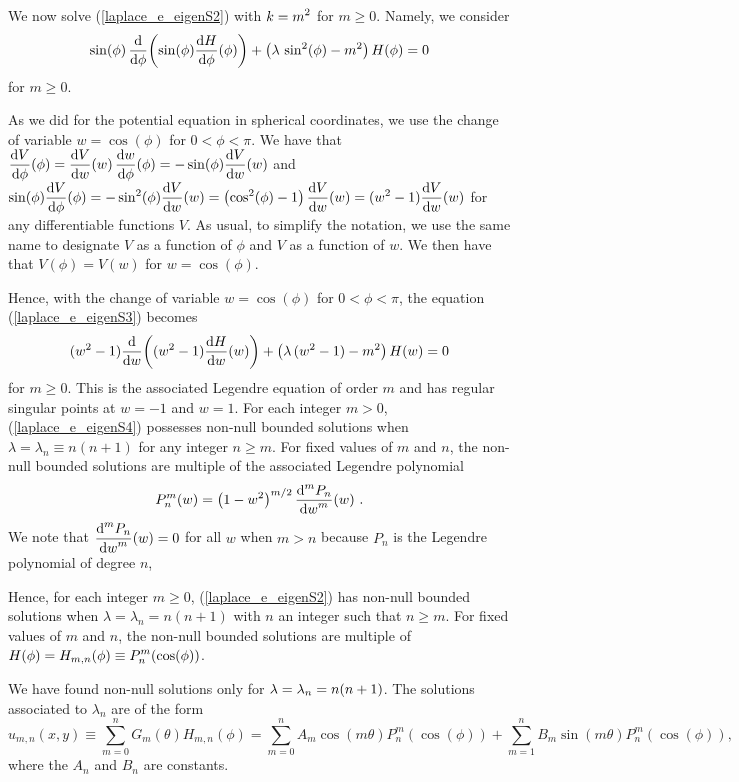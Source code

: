 We now solve (\ref{laplace_e_eigenS2}) with $\DS k=m^2$
for $m\geq 0$.  Namely, we consider
\begin{equation} \label{laplace_e_eigenS3}
\sin(\phi)\,\dfdx{\left(\sin(\phi)\dydx{H}{\phi}(\phi)\right)}{\phi}
+\left(\lambda\,\sin^2(\phi) - m^2\right)H(\phi) = 0
\end{equation}
for $m\geq 0$.

As we did for the potential equation in spherical
coordinates, we use the change of variable $w = \cos(\phi)$ for
$0<\phi<\pi$.
We have that
$\DS \dydx{V}{\phi}(\phi) = \dydx{V}{w}(w)\, \dydx{w}{\phi}(\phi)
= -\sin(\phi) \dydx{V}{w}(w)$ and
$\DS \sin(\phi) \dydx{V}{\phi}(\phi) = - \sin^2(\phi) \dydx{V}{w}(w)
= \left( \cos^2(\phi) - 1 \right) \dydx{V}{w}(w)
= (w^2-1)  \dydx{V}{w}(w)$
for any differentiable functions $V$.  As usual, to simplify the
notation, we use the same name to designate $V$ as a function of
$\phi$ and $V$ as a function of $w$.  We then have that $V(\phi) =
V(w)$ for $w=\cos(\phi)$.

Hence, with the change of variable $w = \cos(\phi)$ for $0<\phi<\pi$,
the equation (\ref{laplace_e_eigenS3}) becomes
\begin{equation} \label{laplace_e_eigenS4}
(w^2-1) \dfdx{\left( (w^2-1) \dydx{H}{w}(w)\right)}{w} 
+ \left( \lambda\,(w^2-1) -m^2\right) H(w) = 0 
\end{equation}
for $m\geq 0$.
This is the associated Legendre equation of order $m$
and has regular singular points at $w=-1$ and $w=1$.  For each
integer $m>0$, (\ref{laplace_e_eigenS4}) possesses non-null
bounded solutions when $\lambda = \lambda_n \equiv n(n+1)$ for
any integer $n \geq m$.  For fixed values of $m$ and
$n$, the non-null bounded solutions are multiple of the associated
Legendre polynomial
\[
P_n^m(w) = \left( 1-w^2 \right)^{m/2} \dydxn{P_n}{w}{m}(w) \ .
\]
We note that $\DS \dydxn{P_n}{w}{m}(w) =0$ for all $w$ when
$m>n$ because $P_n$ is the Legendre polynomial of degree $n$,

Hence, for each integer $m\geq 0$, (\ref{laplace_e_eigenS2}) has
non-null bounded solutions when
$\lambda = \lambda_n = n(n+1)$ with $n$ an integer such that
$n\geq m$.  For fixed values of $m$ and $n$, the non-null bounded
solutions are multiple of
$\DS H(\phi) = H_{m,n}(\phi) \equiv P_n^m(\cos(\phi))$.

We have found non-null solutions only for
$\DS \lambda = \lambda_n = n(n+1)$.  The solutions
associated to $\lambda_n$ are of the form
\[
u_{m,n}(x,y) \equiv \sum_{m=0}^n G_m(\theta)H_{m,n}(\phi)
= \sum_{m=0}^n A_m\cos(m\theta) P_n^m(\cos(\phi))
+ \sum_{m=1}^n B_m\sin(m\theta) P_n^m(\cos(\phi))  ,
\]
where the $A_n$ and $B_n$ are constants.

